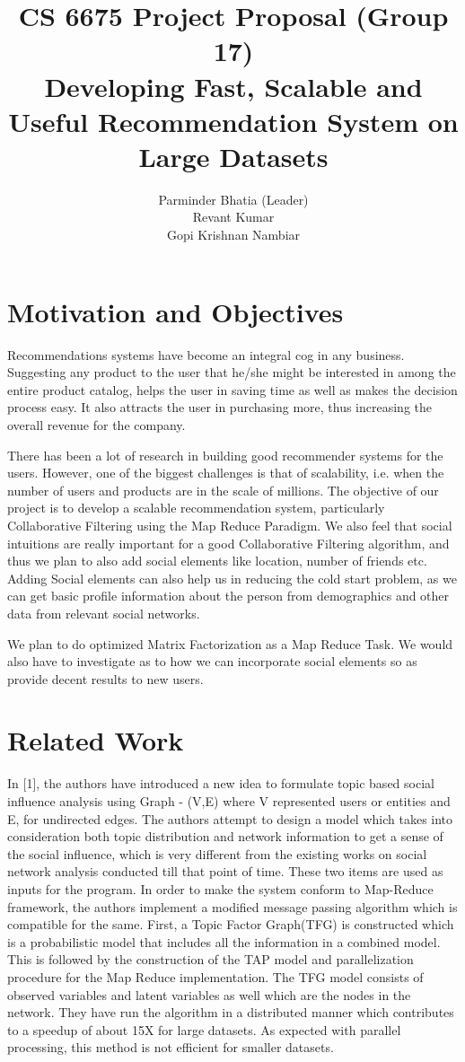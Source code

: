 \documentclass[12pt]{article} %
\title{CS 6675 Project Proposal (Group 17)\\Developing Fast, Scalable and Useful Recommendation System on Large Datasets}
\author{
Parminder Bhatia (Leader)\\
\And
Revant Kumar\\
\And
Gopi Krishnan Nambiar
}
\begin{document}
\maketitle

\section{Motivation and Objectives}

Recommendations systems have become an integral cog in any business. Suggesting any product to the user that he/she might be interested in among the entire product catalog, helps  the user in saving time as well as makes the decision process easy. It also attracts the user in purchasing more, thus increasing the overall revenue for the company.

There has been a lot of research in building good recommender systems for the users. However, one of the biggest challenges is that of scalability, i.e. when the number of users and products are in the scale of millions. The objective of our project is to develop a scalable recommendation system, particularly Collaborative Filtering using the Map Reduce Paradigm. We also feel that social intuitions are really important for a good Collaborative Filtering algorithm, and thus we plan to also add social elements like location, number of friends etc. Adding Social elements can also help us in reducing the cold start problem, as we can get basic profile information about the person from demographics and other data from relevant social networks.

We plan to do optimized Matrix Factorization as a Map Reduce Task. We would also have to investigate as to how we can incorporate social elements so as provide decent results to new users.

\section{Related Work}

In [1], the authors have introduced a new idea to formulate topic based social influence analysis using Graph - (V,E) where V represented users or entities and E, for undirected edges.  The authors attempt to design a model which takes into consideration both topic distribution and network information to get a sense of the social influence, which is very different from the existing works on social network analysis conducted till that point of time. These two items are used as inputs for the program. In order to make the system conform to Map-Reduce framework, the authors implement a modified message passing algorithm which is compatible for the same. First, a Topic Factor Graph(TFG) is constructed which is a probabilistic model that includes all the information in a combined model. This is followed by the construction of the TAP model and parallelization procedure for the Map Reduce implementation. The TFG model consists of observed variables and latent variables as well which are the nodes in the network.
They have run the algorithm in a distributed manner which contributes to a speedup of about 15X for large datasets. As expected with parallel processing, this method is not efficient for smaller datasets.
\end{document}
